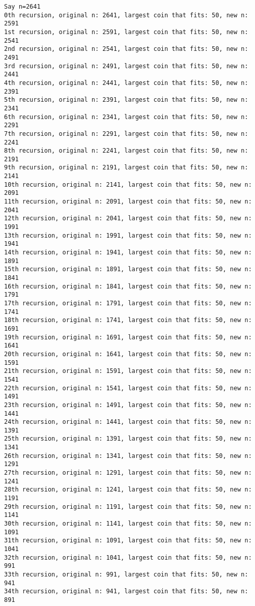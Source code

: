 \documentclass[12pt]{article}
\newenvironment{question}[2][Question]{\begin{trivlist}
		\item[\hskip \labelsep {\bfseries #1}\hskip \labelsep {\bfseries #2.}]}{\end{trivlist}}
\begin{document}
\begin{question}{1a}
\begin{lstlisting}
Say n=2641
0th recursion, original n: 2641, largest coin that fits: 50, new n: 2591
1st recursion, original n: 2591, largest coin that fits: 50, new n: 2541
2nd recursion, original n: 2541, largest coin that fits: 50, new n: 2491
3rd recursion, original n: 2491, largest coin that fits: 50, new n: 2441
4th recursion, original n: 2441, largest coin that fits: 50, new n: 2391
5th recursion, original n: 2391, largest coin that fits: 50, new n: 2341
6th recursion, original n: 2341, largest coin that fits: 50, new n: 2291
7th recursion, original n: 2291, largest coin that fits: 50, new n: 2241
8th recursion, original n: 2241, largest coin that fits: 50, new n: 2191
9th recursion, original n: 2191, largest coin that fits: 50, new n: 2141
10th recursion, original n: 2141, largest coin that fits: 50, new n: 2091
11th recursion, original n: 2091, largest coin that fits: 50, new n: 2041
12th recursion, original n: 2041, largest coin that fits: 50, new n: 1991
13th recursion, original n: 1991, largest coin that fits: 50, new n: 1941
14th recursion, original n: 1941, largest coin that fits: 50, new n: 1891
15th recursion, original n: 1891, largest coin that fits: 50, new n: 1841
16th recursion, original n: 1841, largest coin that fits: 50, new n: 1791
17th recursion, original n: 1791, largest coin that fits: 50, new n: 1741
18th recursion, original n: 1741, largest coin that fits: 50, new n: 1691
19th recursion, original n: 1691, largest coin that fits: 50, new n: 1641
20th recursion, original n: 1641, largest coin that fits: 50, new n: 1591
21th recursion, original n: 1591, largest coin that fits: 50, new n: 1541
22th recursion, original n: 1541, largest coin that fits: 50, new n: 1491
23th recursion, original n: 1491, largest coin that fits: 50, new n: 1441
24th recursion, original n: 1441, largest coin that fits: 50, new n: 1391
25th recursion, original n: 1391, largest coin that fits: 50, new n: 1341
26th recursion, original n: 1341, largest coin that fits: 50, new n: 1291
27th recursion, original n: 1291, largest coin that fits: 50, new n: 1241
28th recursion, original n: 1241, largest coin that fits: 50, new n: 1191
29th recursion, original n: 1191, largest coin that fits: 50, new n: 1141
30th recursion, original n: 1141, largest coin that fits: 50, new n: 1091
31th recursion, original n: 1091, largest coin that fits: 50, new n: 1041
32th recursion, original n: 1041, largest coin that fits: 50, new n: 991
33th recursion, original n: 991, largest coin that fits: 50, new n: 941
34th recursion, original n: 941, largest coin that fits: 50, new n: 891

\end{lstlisting}
\end{question}
\end{document}
